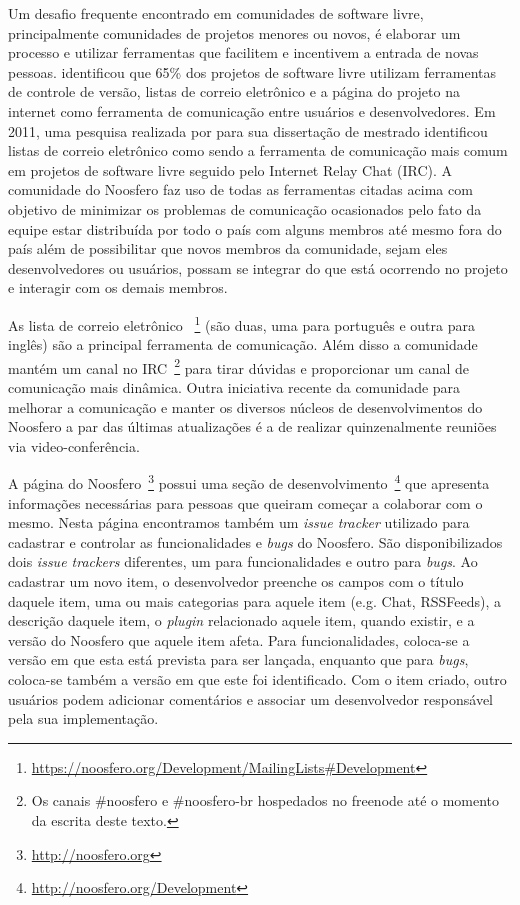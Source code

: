 Um desafio frequente encontrado em comunidades de software livre, principalmente
comunidades de projetos menores ou novos, é elaborar um processo e utilizar
ferramentas que facilitem e incentivem a entrada de novas pessoas. 
 identificou que 65\% dos projetos de software livre
utilizam ferramentas de controle de versão, listas de correio eletrônico e a
página do projeto na internet como ferramenta de comunicação entre usuários e
desenvolvedores. Em 2011, uma pesquisa realizada por 
para sua dissertação de mestrado identificou listas de correio eletrônico como
sendo a ferramenta de comunicação mais comum em projetos de software livre
seguido pelo Internet Relay Chat (IRC).
%
A comunidade do Noosfero faz uso de todas as ferramentas citadas acima com
objetivo de minimizar  os problemas de comunicação ocasionados pelo fato da
equipe estar distribuída por todo o país com alguns membros até mesmo fora do
país além de possibilitar que novos membros da comunidade, sejam eles
desenvolvedores ou usuários, possam se integrar do que está ocorrendo no
projeto e interagir com os demais membros.

As lista de correio eletrônico
~\footnote{\url{https://noosfero.org/Development/MailingLists\#Development}}
(são duas, uma para português e outra para inglês) são a principal ferramenta
de comunicação. 
%
Além disso a comunidade mantém um canal no IRC~\footnote{Os canais \#noosfero e
\#noosfero-br hospedados no freenode até o momento da escrita deste texto.}
para tirar dúvidas e proporcionar um canal de comunicação mais dinâmica.
%
Outra iniciativa recente da comunidade para melhorar a comunicação e manter os
diversos núcleos de desenvolvimentos do Noosfero a par das últimas atualizações
é a de realizar quinzenalmente reuniões via video-conferência.

A página do Noosfero~\footnote{\url{http://noosfero.org}} possui uma seção de
desenvolvimento~\footnote{\url{http://noosfero.org/Development}} que apresenta
informações necessárias para pessoas que queiram começar a colaborar com o
mesmo. Nesta página encontramos também um \textit{issue tracker} utilizado para
cadastrar e controlar as funcionalidades e \textit{bugs} do Noosfero.
%
São disponibilizados dois \textit{issue trackers} diferentes, um para
funcionalidades e outro para \textit{bugs}. Ao cadastrar um novo item, o
desenvolvedor preenche os campos com o título daquele item, uma ou mais
categorias para aquele item (e.g. Chat, RSSFeeds), a descrição daquele
item, o \textit{plugin} relacionado aquele item, quando existir, e a
versão do Noosfero que aquele item afeta.
%
Para funcionalidades, coloca-se a
versão em que esta está prevista para ser lançada, enquanto que para
\textit{bugs}, coloca-se também a versão em que este foi identificado. Com o
item criado, outro usuários podem adicionar comentários e associar um
desenvolvedor responsável pela sua implementação.

